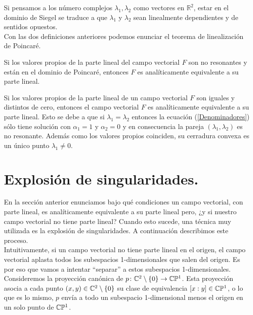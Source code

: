 Si pensamos a los número complejos $\lambda_{1},\lambda_{2}$ como vectores en $\mathbb{R}^{2}$, estar en el dominio de Siegel se traduce a que $\lambda_{1}$ y $\lambda_{2}$ sean linealmente dependientes y de sentidos opuestos.\\

Con las dos definiciones anteriores podemos enunciar el teorema de linealización de Poincaré.
\begin{Teorema}
Si los valores propios de la parte lineal del campo vectorial $F$ son no resonantes y están en el dominio de Poincaré, entonces $F$ es analíticamente equivalente a su parte lineal.
\end{Teorema}

\begin{Ejemplo}
\label{Ej:LinealizacionRadial}
Si los valores propios de la parte lineal de un campo vectorial $F$ son iguales y distintos de cero, entonces el campo vectorial $F$ es analíticamente equivalente a su parte lineal. Esto se debe a que si $\lambda_{1}=\lambda_{2}$ entonces la ecuación (\ref{Denominadores}) sólo tiene solución con $\alpha_{1}=1$ y $\alpha_{2}=0$ y en consecuencia la pareja $(\lambda_{1},\lambda_{2})$ es no resonante. Además como los valores propios coinciden, su cerradura convexa es un único punto $\lambda_{1}\neq 0$. 
\end{Ejemplo}

\section{Explosión de singularidades.}  

En la sección anterior enunciamos bajo qué condiciones un campo vectorial, con parte lineal, es analíticamente equivalente a su parte lineal pero, ¿y si nuestro campo vectorial no tiene parte lineal? Cuando esto sucede, una técnica muy utilizada es la explosión de singularidades. A continuación describimos este proceso.\\

Intuitivamente, si un campo vectorial no tiene parte lineal en el origen, el campo vectorial aplasta todos los subespacios 1-dimensionales que salen del origen. Es por eso que vamos a intentar ``separar'' a estos subespacios 1-dimensionales.\\

Consideremos la proyección canónica de $p\colon\mathbb{C}^{2}\setminus\{0\}\rightarrow\mathbb{C}\mathbb{P}^{1}$. Esta proyección asocia a cada punto $(x,y)\in\mathbb{C}^{2}\setminus\{0\}$ su clase de equivalencia $[x:y]\in\mathbb{C}\mathbb{P}^{1}$, o lo que es lo mismo, $p$ envía a todo un subespacio 1-dimensional menos el origen en un solo punto de $\mathbb{C}\mathbb{P}^{1}$.\\

